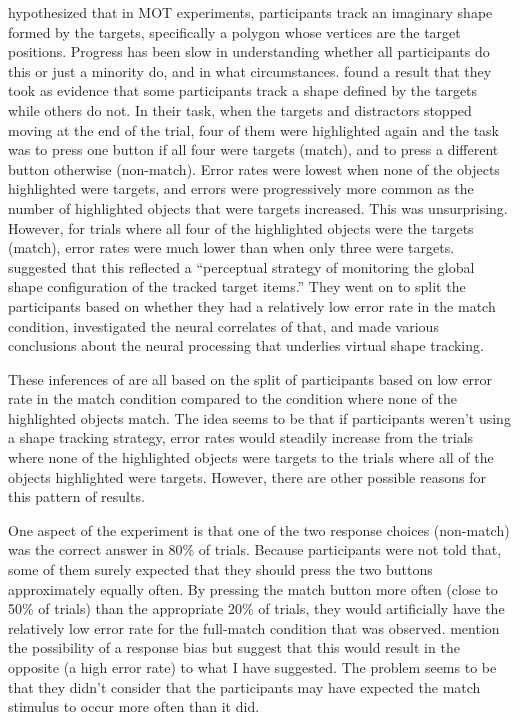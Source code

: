 \documentclass[
]{book}
\begin{document}
\citet{yantisMultielementVisualTracking1992} hypothesized that in MOT experiments, participants track an imaginary shape formed by the targets, specifically a polygon whose vertices are the target positions. Progress has been slow in understanding whether all participants do this or just a minority do, and in what circumstances. \citet{merkelSpatiotemporalPatternsBrain2014} found a result that they took as evidence that some participants track a shape defined by the targets while others do not. In their task, when the targets and distractors stopped moving at the end of the trial, four of them were highlighted again and the task was to press one button if all four were targets (match), and to press a different button otherwise (non-match). Error rates were lowest when none of the objects highlighted were targets, and errors were progressively more common as the number of highlighted objects that were targets increased. This was unsurprising. However, for trials where all four of the highlighted objects were the targets (match), error rates were much lower than when only three were targets. \citet{merkelSpatiotemporalPatternsBrain2014} suggested that this reflected a ``perceptual strategy of monitoring the global shape configuration of the tracked target items.'' They went on to split the participants based on whether they had a relatively low error rate in the match condition, investigated the neural correlates of that, and made various conclusions about the neural processing that underlies virtual shape tracking.

These inferences of \citet{merkelSpatiotemporalPatternsBrain2014} are all based on the split of participants based on low error rate in the match condition compared to the condition where none of the highlighted objects match. The idea seems to be that if participants weren't using a shape tracking strategy, error rates would steadily increase from the trials where none of the highlighted objects were targets to the trials where all of the objects highlighted were targets. However, there are other possible reasons for this pattern of results.

One aspect of the \citet{merkelSpatiotemporalPatternsBrain2014} experiment is that one of the two response choices (non-match) was the correct answer in 80\% of trials. Because participants were not told that, some of them surely expected that they should press the two buttons approximately equally often. By pressing the match button more often (close to 50\% of trials) than the appropriate 20\% of trials, they would artificially have the relatively low error rate for the full-match condition that was observed. \citet{merkelSpatiotemporalPatternsBrain2014} mention the possibility of a response bias but suggest that this would result in the opposite (a high error rate) to what I have suggested. The problem seems to be that they didn't consider that the participants may have expected the match stimulus to occur more often than it did.
\end{document}
